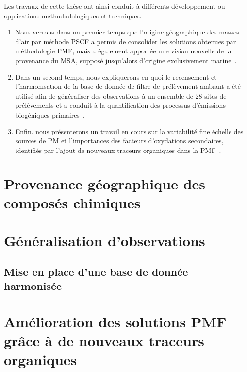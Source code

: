 Les travaux de cette thèse ont ainsi conduit à différents développement ou applications
méthododologiques et techniques.
\begin{enumerate}
    \item Nous verrons dans un premier temps que l'origine géographique des masses d'air
        par méthode PSCF a permis de consolider les solutions obtenues par méthodologie
        PMF, mais a également apportée une vision nouvelle de la provenance du MSA,
        supposé jusqu'alors d'origine exclusivement marine~\autocite{gollyOrganic2019}.
    \item Dans un second temps, nous expliquerons en quoi le recensement et
        l'harmonisation de la base de donnée de filtre de prélèvement ambiant a été
        utilisé afin de généraliser des observations à un ensemble de 28 sites de
        prélèvements et a conduit à la quantification des processus d'émissions
        biogéniques primaires~\autocite{samakePolyols2019,samakeArabitol2019}.
    \item Enfin, nous présenterons un travail en cours sur la variabilité fine échelle des
        sources de PM et l'importances des facteurs d'oxydations secondaires, identifiés
        par l'ajout de nouveaux traceurs organiques dans la
        PMF~\autocite{borlazaSourceinprep}.
\end{enumerate}


\section{Provenance géographique des composés chimiques}%
\label{sec:provenance_géographique_des_composés_chimiques}


\section{Généralisation d'observations}%
\label{sec:généralisation_dobservations}

\subsection{Mise en place d'une base de donnée harmonisée}%
\label{sub:mise_en_place_d_une_base_de_donnée_harmonisée}



\section{Amélioration des solutions PMF grâce à de nouveaux traceurs organiques}%
\label{sec:amélioration_des_solutions_pmf_grâce_à_de_nouveaux_traceurs_organiques}


\printbibliography[segment=\therefsegment,heading=subbibliography]
